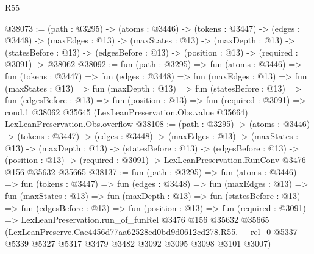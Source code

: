 \begin{lexlean}{R55}
\begin{coremodule}
@38073 := (path : @3295) ->
  (atoms : @3446) ->
  (tokens : @3447) ->
  (edges : @3448) ->
  (maxEdges : @13) ->
  (maxStates : @13) ->
  (maxDepth : @13) ->
  (statesBefore : @13) -> (edgesBefore : @13) -> (position : @13) -> (required : @3091) -> @38062
@38092 := fun (path : @3295) =>
  fun (atoms : @3446) =>
  fun (tokens : @3447) =>
  fun (edges : @3448) =>
  fun (maxEdges : @13) =>
  fun (maxStates : @13) =>
  fun (maxDepth : @13) =>
  fun (statesBefore : @13) =>
  fun (edgesBefore : @13) =>
  fun (position : @13) =>
  fun (required : @3091) =>
  cond.{1} @38062 @35645 (LexLeanPreservation.Obs.value @35664) LexLeanPreservation.Obs.overflow
@38108 := (path : @3295) ->
  (atoms : @3446) ->
  (tokens : @3447) ->
  (edges : @3448) ->
  (maxEdges : @13) ->
  (maxStates : @13) ->
  (maxDepth : @13) ->
  (statesBefore : @13) ->
  (edgesBefore : @13) ->
  (position : @13) -> (required : @3091) -> LexLeanPreservation.RunConv @3476 @156 @35632 @35665
@38137 := fun (path : @3295) =>
  fun (atoms : @3446) =>
  fun (tokens : @3447) =>
  fun (edges : @3448) =>
  fun (maxEdges : @13) =>
  fun (maxStates : @13) =>
  fun (maxDepth : @13) =>
  fun (statesBefore : @13) =>
  fun (edgesBefore : @13) =>
  fun (position : @13) =>
  fun (required : @3091) =>
  LexLeanPreservation.run_of_funRel
    @3476
    @156
    @35632
    @35665
    (LexLeanPreserve.Cae4456d77aa62528ed0bd9d0612cd278.R55.__rel_0
      @5337
      @5339
      @5327
      @5317
      @3479
      @3482
      @3092
      @3095
      @3098
      @3101
      @3007)
\end{coremodule}
\end{lexlean}
